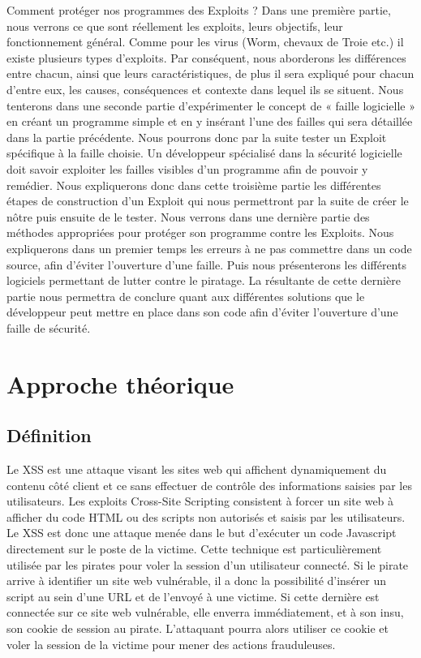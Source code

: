 \documentclass[a4paper,12pt]{report}
\begin{document}
Comment protéger nos programmes des Exploits ?
Dans une première partie, nous verrons ce que sont réellement les exploits, leurs objectifs, leur fonctionnement général. Comme pour les virus (Worm, chevaux de Troie etc.) il existe plusieurs types d’exploits. Par conséquent, nous aborderons les différences entre chacun, ainsi que leurs caractéristiques, de plus il sera expliqué pour chacun d’entre eux, les causes, conséquences et contexte dans lequel ils se situent.
Nous tenterons dans une seconde partie d’expérimenter le concept de « faille logicielle » en créant un programme simple et en y insérant l’une des failles qui sera détaillée dans la partie précédente. Nous pourrons donc par la suite tester un Exploit spécifique à la faille choisie.
Un développeur spécialisé dans la sécurité logicielle doit savoir exploiter les failles visibles d’un programme afin de pouvoir y remédier. Nous expliquerons donc dans cette troisième partie les différentes étapes de construction d’un Exploit  qui nous permettront par la suite de créer le nôtre puis ensuite de le tester.
Nous verrons dans une dernière partie des méthodes appropriées pour protéger son programme contre les Exploits. Nous expliquerons dans un premier temps les erreurs à ne pas commettre dans un code source, afin d’éviter l’ouverture d’une faille. Puis nous présenterons les différents logiciels permettant de lutter contre le piratage.
La résultante de cette dernière partie nous permettra de conclure quant aux différentes solutions que le développeur peut mettre en place dans son code afin d’éviter l’ouverture d’une faille de sécurité.
		
			
		\newpage
	
	\chapter{Approche théorique} %
	\section{Définition}	
Le XSS est une attaque visant les sites web qui affichent dynamiquement du contenu côté client et ce sans effectuer de contrôle des informations saisies par les utilisateurs. Les exploits Cross-Site Scripting consistent à forcer un site web à afficher du code HTML ou des scripts non autorisés et saisis par les utilisateurs. Le XSS est donc une attaque menée dans le but d'exécuter un code Javascript directement sur le poste de la victime. Cette technique est particulièrement utilisée par les pirates pour voler la session d'un utilisateur connecté.
Si le pirate arrive à identifier un site web vulnérable, il a donc la possibilité d’insérer un script au sein d’une URL et de l’envoyé à une victime. Si cette dernière est connectée sur ce site web vulnérable, elle enverra immédiatement, et à son insu, son cookie de session au pirate. L'attaquant pourra alors utiliser ce cookie et voler la session de la victime pour mener des actions frauduleuses.
\end{document}
